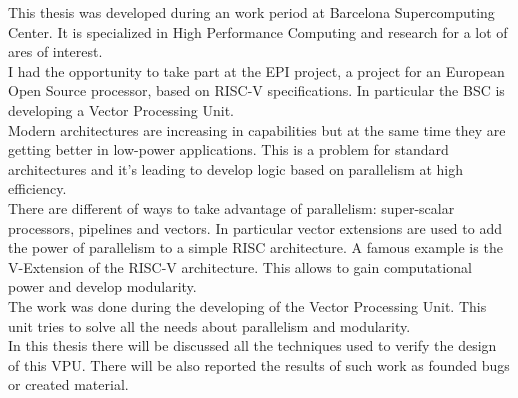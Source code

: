 \summary
\english

This thesis was developed during an work period at Barcelona Supercomputing Center. It is specialized in High Performance Computing and research for a lot of ares of interest.\\

I had the opportunity to take part at the EPI project, a project for an European Open Source processor, based on RISC-V specifications. In particular the BSC is developing a Vector Processing Unit.\\
 
Modern architectures are increasing in capabilities but at the same time they are getting better in low-power applications.
This  is a problem for standard architectures and it's leading to develop logic based on parallelism at high efficiency.\\

There are different of ways to take advantage of parallelism: super-scalar processors, pipelines and vectors. In particular vector extensions are used to add the power of parallelism to a simple RISC architecture. A famous example is the V-Extension of the RISC-V architecture. This allows to gain computational power and develop modularity.\\

The work was done during the developing of the Vector Processing Unit. This unit tries to solve all the needs about parallelism and modularity.\\

In this thesis there will be discussed all the techniques used to verify the design of this VPU. There will be also reported the results of such work as founded bugs or created material.








\bigskip
